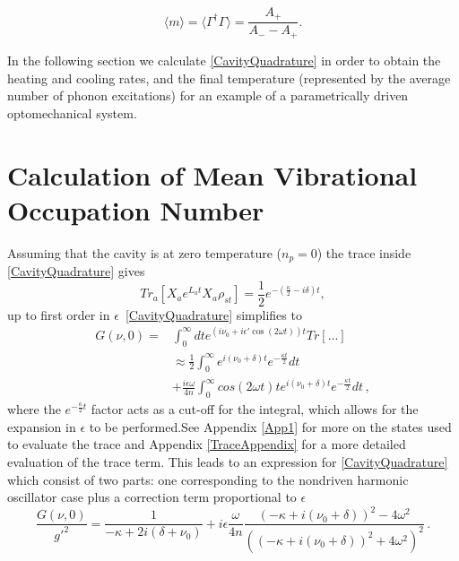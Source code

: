 \documentclass[reprint, amsmath,amssymb, aps,pra]{revtex4-1}
\begin{document}
\begin{equation}
\langle m \rangle =\langle \Gamma^\dagger \Gamma \rangle = \frac{A_+}{A_- - A_+}.
\end{equation}

In the following section we calculate \eqref{CavityQuadrature} in
order to obtain the heating and cooling rates, and the final
temperature (represented by the average number of phonon excitations)
for an example of a parametrically driven optomechanical system.

\section{Calculation of Mean Vibrational Occupation Number}\label{NumCal}

Assuming that the cavity is at zero temperature ($n_p=0$) the trace
inside \eqref{CavityQuadrature} gives
\begin{equation}
Tr_a[X_a e^{L_a t} X_a \rho_{st}] = \frac{1}{2}e^{-(\frac{\kappa}{2}-i\delta) t},
\end{equation} 
up to first order in $\epsilon$~\eqref{CavityQuadrature} simplifies to
\begin{align}
  G(\nu,0)=&\int_0^\infty dt e^{(i\nu_0 +i\epsilon'\cos{(2\omega t)})t }Tr[...]\nonumber\\
           &\approx\frac{1}{2}\int_0^\infty e^{i (\nu_0+\delta)
             t}e^{-\frac{\kappa t}{2}}dt\nonumber\\
           &+\frac{i\epsilon \omega}{4n}\int_0^\infty cos(2\omega t)t e^{i (\nu_0+\delta)
             t}e^{-\frac{\kappa t}{2}}dt\, ,\nonumber
\end{align}
where the $e^{-\frac{\kappa}{2} t}$ factor acts as a cut-off for the integral, which
allows for the expansion in $\epsilon$ to be performed.See Appendix
\ref{App1} for more on the states used to evaluate the trace and Appendix \ref{TraceAppendix} for a more detailed evaluation of the trace term. This leads
to an expression for \eqref{CavityQuadrature} which consist of two
parts: one corresponding to the nondriven harmonic oscillator case
plus a correction term proportional to $\epsilon$
\begin{equation}
\frac{G(\nu,0)}{g'^2}= \frac{1}{-\kappa + 2i(\delta + \nu_0)} +i\epsilon\frac{\omega}{4n}\frac{(-\kappa + i(\nu_0 + \delta))^2 - 4\omega^2}{((-\kappa + i(\nu_0 + \delta))^2 + 4\omega^2)^2}\, .
\end{equation} %
\end{document}

